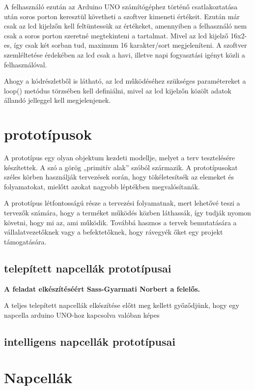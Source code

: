 \documentclass[
]{thesis-ekf}
\theoremstyle{definition}
\theoremstyle{remark}
\begin{document}
							
			\par A felhasználó ezután az Arduino UNO számítógéphez történő csatlakoztatása után soros porton keresztül követheti a szoftver kimeneti értékeit. Ezután már csak az lcd kijelzőn kell feltüntessük az értékeket, amennyiben a felhasználó nem csak a soros porton szeretné megtekinteni a tartalmat. Mivel az lcd kijelző 16x2-es, így csak két sorban tud, maximum 16 karakter/sort megjeleníteni. A szoftver szemléltetése érdekében az lcd csak a havi, illetve napi fogyasztási igényt közli a felhasználóval. 
								
			\par Ahogy a kódrészletből is látható, az lcd működéséhez szükséges paramétereket a loop() metódus törzsében kell definiálni, mivel az lcd kijelzőn közölt adatok állandó jelleggel kell megjelenjenek.
	\section{prototípusok}
		\par A prototípus egy olyan objektum kezdeti modellje, melyet a terv tesztelésére készítettek. A szó a görög „primitív alak” szóból származik. A prototípusokat széles körben használják tervezések során, hogy tökéletesítsék az elemeket és folyamatokat, mielőtt azokat nagyobb léptékben megvalósítanák. \cite{prototype}
		\par A prototípus létfontosságú része a tervezési folyamatnak, mert lehetővé teszi a tervezők számára, hogy a terméket működés közben láthassák, így tudják nyomon követni, hogy mi az, ami működik. Továbbá hasznos a tervek bemutatására a vállalatvezetőknek vagy a befektetőknek, hogy rávegyék őket egy projekt támogatására.\cite{prototype}
		\subsection{telepített napcellák prototípusai}
			\textbf{A feladat elkészítéséért Sass-Gyarmati Norbert a felelős.} 
			\par A teljes telepített napcellák elkészítése előtt meg kellett győződjünk, hogy egy napcella arduino UNO-hoz kapcsolva valóban képes
		\subsection{intelligens napcellák prototípusai}
 	\section{Napcellák}
\end{document}
